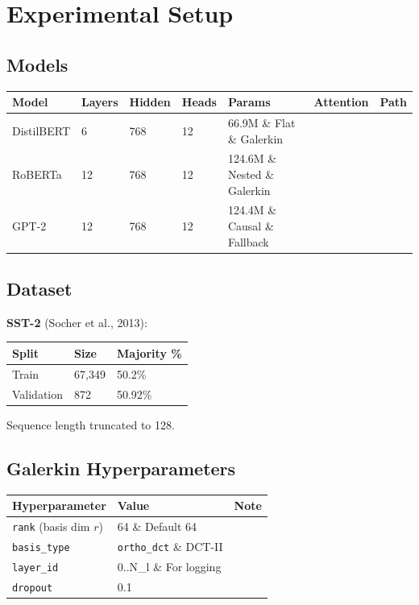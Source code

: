 
\section{Experimental Setup}

\subsection{Models}

\begin{table}[H]
\centering
\small
\begin{tabular}{lllllll}
\toprule
\textbf{Model} & \textbf{Layers} & \textbf{Hidden} & \textbf{Heads} & \textbf{Params} & \textbf{Attention} & \textbf{Path} \\
\midrule
DistilBERT & 6 & 768 & 12 & 66.9M \& Flat \& Galerkin \\
RoBERTa & 12 & 768 & 12 & 124.6M \& Nested \& Galerkin \\
GPT-2 & 12 & 768 & 12 & 124.4M \& Causal \& Fallback \\
\bottomrule
\end{tabular}
\end{table}

\subsection{Dataset}

\textbf{SST-2} (Socher et al., 2013):

\begin{table}[H]
\centering
\small
\begin{tabular}{lll}
\toprule
\textbf{Split} & \textbf{Size} & \textbf{Majority \%} \\
\midrule
Train & 67,349 & 50.2\% \\
Validation & 872 & 50.92\% \\
\bottomrule
\end{tabular}
\end{table}

Sequence length truncated to 128.

\subsection{Galerkin Hyperparameters}

\begin{table}[H]
\centering
\small
\begin{tabular}{lll}
\toprule
\textbf{Hyperparameter} & \textbf{Value} & \textbf{Note} \\
\midrule
\texttt{rank} (basis dim $r$) & 64 \& Default 64 \\
\texttt{basis\_type} & \texttt{ortho\_dct} \& DCT-II \\
\texttt{layer\_id} & 0..N\_l \& For logging \\
\texttt{dropout} & 0.1 &  \\
\bottomrule
\end{tabular}
\end{table}

